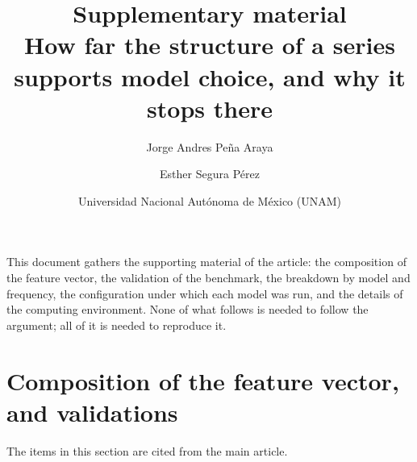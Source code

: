 %
%
\title{Supplementary material\\
       \large How far the structure of a series supports model choice,
       and why it stops there}
\author{Jorge Andres Pe\~na Araya \and Esther Segura P\'erez}
\date{Universidad Nacional Aut\'onoma de M\'exico (UNAM)}
\maketitle

\renewcommand{\thetable}{S\arabic{table}}
\renewcommand{\thefigure}{S\arabic{figure}}
\renewcommand{\thesection}{S\arabic{section}}
\setcounter{section}{0}

\noindent
This document gathers the supporting material of the article: the composition of the
feature vector, the validation of the benchmark, the breakdown by model and frequency,
the configuration under which each model was run, and the details of the computing
environment. None of what follows is needed to follow the argument; all of it is needed
to reproduce it.

\section{Composition of the feature vector, and validations}

The items in this section are cited from the main article.

